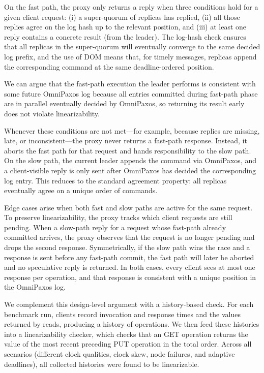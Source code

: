 \documentclass{article}
\begin{document}
On the fast path, the proxy only returns a reply when three conditions hold for a given client request: (i) a super-quorum of replicas has replied, (ii) all those replies agree on the log hash up to the relevant position, and (iii) at least one reply contains a concrete result (from the leader). The log-hash check ensures that all replicas in the super-quorum will eventually converge to the same decided log prefix, and the use of DOM means that, for timely messages, replicas append the corresponding command at the same deadline-ordered position. 

We can argue that the fast-path execution the leader performs is consistent with some future OmniPaxos log because all entries committed during fast-path phase are in parallel eventually decided by OmniPaxos, so returning its result early does not violate linearizability.

Whenever these conditions are not met---for example, because replies are missing, late, or inconsistent---the proxy never returns a fast-path response. Instead, it aborts the fast path for that request and hands responsibility to the slow path. On the slow path, the current leader appends the command via OmniPaxos, and a client-visible reply is only sent after OmniPaxos has decided the corresponding log entry. This reduces to the standard agreement property: all replicas eventually agree on a unique order of commands.

Edge cases arise when both fast and slow paths are active for the same request. To preserve linearizability, the proxy tracks which client requests are still pending. When a slow-path reply for a request whose fast-path already committed arrives, the proxy observes that the request is no longer pending and drops the second response. Symmetrically, if the slow path wins the race and a response is sent before any fast-path commit, the fast path will later be aborted and no speculative reply is returned. In both cases, every client sees at most one response per operation, and that response is consistent with a unique position in the OmniPaxos log.

We complement this design-level argument with a history-based check. For each benchmark run, clients record invocation and response times and the values returned by reads, producing a history of operations. We then feed these histories into a linearizability checker, which checks that an GET operation returns the value of the most recent preceding PUT operation in the total order. Across all scenarios (different clock qualities, clock skew, node failures, and adaptive deadlines), all collected histories were found to be linearizable.
\end{document}

